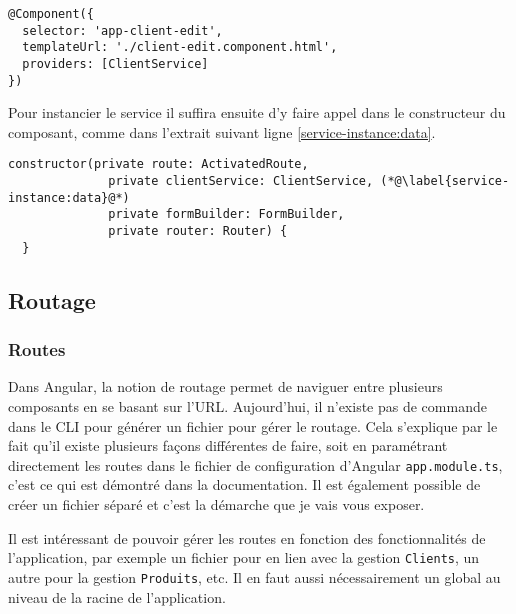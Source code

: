 \begin{lstlisting}[style=htmlcssjs, caption={Injection d'un service dans un composant}, label=service-injection]
@Component({
  selector: 'app-client-edit',
  templateUrl: './client-edit.component.html',
  providers: [ClientService]
})
\end{lstlisting}

Pour instancier le service il suffira ensuite d'y faire appel dans le constructeur du composant, comme dans l'extrait suivant ligne \ref{service-instance:data}.
\begin{lstlisting}[style=htmlcssjs, caption={Instanciation d'un service dans un composant}, label=service-instance]
constructor(private route: ActivatedRoute,
              private clientService: ClientService, (*@\label{service-instance:data}@*)
              private formBuilder: FormBuilder,
              private router: Router) {
  }
\end{lstlisting}

\subsection{Routage}
\subsubsection{Routes}
Dans Angular, la notion de routage permet de naviguer entre plusieurs composants en se basant sur l'URL. Aujourd'hui, il n'existe pas de commande dans le CLI pour générer un fichier pour gérer le routage. Cela s'explique par le fait qu'il existe plusieurs façons différentes de faire, soit en paramétrant directement les routes dans le fichier de configuration d'Angular \texttt{app.module.ts}, c'est ce qui est démontré dans la documentation. Il est également possible de créer un fichier séparé et c'est la démarche que je vais vous exposer.

Il est intéressant de pouvoir gérer les routes en fonction des fonctionnalités de l'application, par exemple un fichier pour en lien avec la gestion \texttt{Clients}, un autre pour la gestion \texttt{Produits}, etc. Il en faut aussi nécessairement un global au niveau de la racine de l'application.


